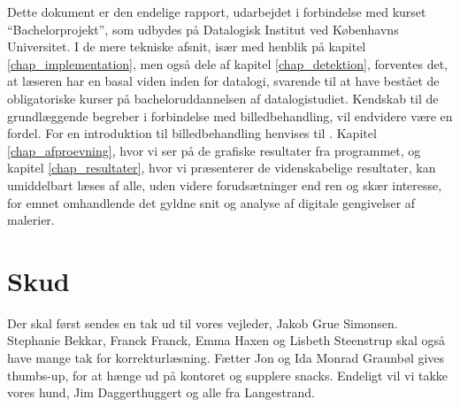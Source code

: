 {
{\sffamily Dette dokument er den endelige rapport, udarbejdet i
forbindelse med kurset ``Bachelorprojekt'', som udbydes på Datalogisk
Institut ved Københavns Universitet. I de mere tekniske afsnit, især med
henblik på kapitel \ref{chap_implementation}, men også dele af kapitel
\ref{chap_detektion}, forventes det, at læseren har en basal viden inden
for datalogi, svarende til at have bestået de obligatoriske kurser på
bacheloruddannelsen af datalogistudiet\cite{DIKUkurser}. Kendskab til de
grundlæggende begreber i forbindelse med billedbehandling, vil endvidere
være en fordel. For en introduktion til billedbehandling henvises til
\cite{SIOlsen}. Kapitel \ref{chap_afproevning}, hvor vi ser på de
grafiske resultater fra programmet, og kapitel \ref{chap_resultater},
hvor vi præsenterer de videnskabelige resultater, kan umiddelbart læses
af alle, uden videre forudsætninger end ren og skær interesse, for emnet
omhandlende det gyldne snit og analyse af digitale gengivelser af
malerier.

\section*{Skud}
Der skal først sendes en tak ud til vores vejleder, Jakob Grue Simonsen.
Stephanie Bekkar, Franck Franck, Emma Haxen og Lisbeth Steenstrup skal
også have mange tak for korrekturlæsning. Fætter Jon og Ida Monrad
Graunbøl gives thumbs-up, for at hænge ud på kontoret og supplere
snacks. Endeligt vil vi takke vores hund, Jim Daggerthuggert og alle fra
Langestrand.

}
}

